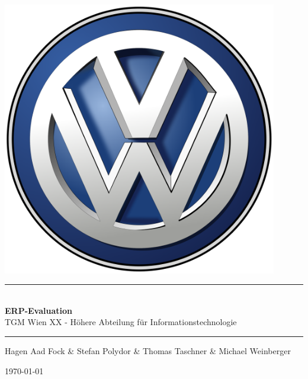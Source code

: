 \documentclass[12pt]{article}
\begin{document}
\begin{titlepage}
\begin{center}
\includegraphics[width=0.9\textwidth]{images/vwlogo}\\[1cm]    


\rule{1.0\textwidth}{1mm}
{ \huge \bfseries \\[0.4cm]  \huge ERP-Evaluation \\[0.4cm] }
\LARGE TGM Wien XX - Höhere Abteilung für Informationstechnologie  \\[0.4cm]

\rule{1.0\textwidth}{1mm}




\noindent 
\vspace{3cm}

\begin{center}
\large
Hagen Aad Fock \&
Stefan Polydor \&
Thomas Taschner \&
Michael Weinberger
\end{center}

\vfill

{\large \today}

\end{center}
\end{titlepage}

\tableofcontents


\ohead{\headmark}
\end{document}
